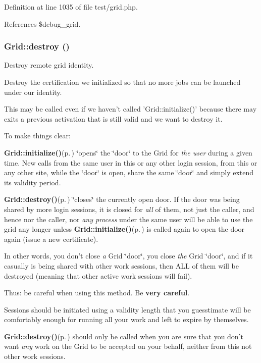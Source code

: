 Definition at line 1035 of file test/grid.php.

References \$debug\_\-grid.
\subsubsection{\setlength{\rightskip}{0pt plus 5cm}Grid::destroy ()}\label{classGrid_a12}


Destroy remote grid identity. 

Destroy the certification we initialized so that no more jobs can be launched under our identity.

This may be called even if we haven't called 'Grid::initialize()' because there may exits a previous activation that is still valid and we want to destroy it.

To make things clear:

{\bf Grid::initialize()}{\rm (p.\,\pageref{classGrid_a11})} \char`\"{}opens\char`\"{} the \char`\"{}door\char`\"{} to the Grid for {\em the user\/} during a given time. New calls from the same user in this or any other login session, from this or any other site, while the \char`\"{}door\char`\"{} is open, share the same \char`\"{}door\char`\"{} and simply extend its validity period.

{\bf Grid::destroy()}{\rm (p.\,\pageref{classGrid_a12})} \char`\"{}closes\char`\"{} the currently open door. If the door was being shared by more login sessions, it is closed for {\em all\/} of them, not just the caller, and hence nor the caller, nor {\em any process\/} under the same user will be able to use the grid any longer unless {\bf Grid::initialize()}{\rm (p.\,\pageref{classGrid_a11})} is called again to open the door again (issue a new certificate).

In other words, you don't close {\em a\/} Grid \char`\"{}door\char`\"{}, you close {\em the\/} Grid \char`\"{}door\char`\"{}, and if it casually is being shared with other work sessions, then ALL of them will be destroyed (meaning that other active work sessions will fail).

Thus: be careful when using this method. Be {\bf very careful}.

Sessions should be initiated using a validity length that you guesstimate will be comfortably enough for running all your work and left to expire by themselves.

{\bf Grid::destroy()}{\rm (p.\,\pageref{classGrid_a12})} should only be called when you are sure that you don't want {\em any\/} work on the Grid to be accepted on your behalf, neither from this not other work sessions.

